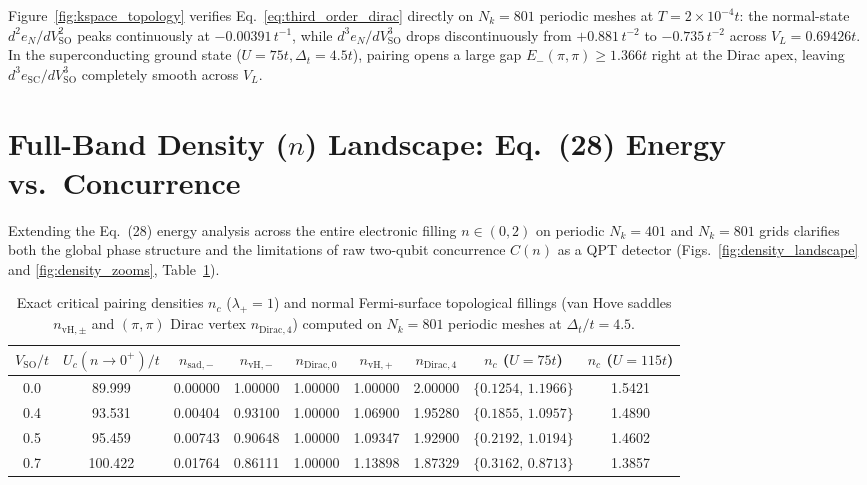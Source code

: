 \documentclass[aps,prb,twocolumn,superscriptaddress,longbibliography,floatfix]{revtex4-2}
\newcommand{\SO}{V_{\mathrm{SO}}}
\begin{document}
Figure~\ref{fig:kspace_topology} verifies Eq.~\eqref{eq:third_order_dirac} directly on $N_k=801$ periodic meshes at $T=2\times 10^{-4}t$: the normal-state $d^2e_N/d\SO^2$ peaks continuously at $-0.00391\,t^{-1}$, while $d^3e_N/d\SO^3$ drops discontinuously from $+0.881\,t^{-2}$ to $-0.735\,t^{-2}$ across $V_L = 0.69426t$. In the superconducting ground state ($U=75t,\Delta_t=4.5t$), pairing opens a large gap $E_-(\pi,\pi)\ge 1.366t$ right at the Dirac apex, leaving $d^3e_{\mathrm{SC}}/d\SO^3$ completely smooth across $V_L$.

\section{Full-Band Density (\texorpdfstring{$n$}{n}) Landscape: Eq.~(28) Energy vs.\ Concurrence}
\label{sec:density_landscape}

Extending the Eq.~(28) energy analysis across the entire electronic filling $n\in(0,2)$ on periodic $N_k=401$ and $N_k=801$ grids clarifies both the global phase structure and the limitations of raw two-qubit concurrence $C(n)$ as a QPT detector (Figs.~\ref{fig:density_landscape} and \ref{fig:density_zooms}, Table~\ref{tab:density_critical}).

\begin{table}[t]
\centering
\caption{Exact critical pairing densities $n_c$ ($\lambda_+=1$) and normal Fermi-surface topological fillings (van Hove saddles $n_{\mathrm{vH},\pm}$ and $(\pi,\pi)$ Dirac vertex $n_{\mathrm{Dirac},4}$) computed on $N_k=801$ periodic meshes at $\Delta_t/t=4.5$.}
\label{tab:density_critical}
\begin{tabular}{ccccccccc}
\toprule
$\SO/t$ & $U_c(n\to 0^+)/t$ & $n_{\mathrm{sad},-}$ & $n_{\mathrm{vH},-}$ & $n_{\mathrm{Dirac},0}$ & $n_{\mathrm{vH},+}$ & $n_{\mathrm{Dirac},4}$ & $n_c$ ($U=75t$) & $n_c$ ($U=115t$) \\
\midrule
0.0 & 89.999 & 0.00000 & 1.00000 & 1.00000 & 1.00000 & 2.00000 & $\{0.1254,\, 1.1966\}$ & 1.5421 \\
0.4 & 93.531 & 0.00404 & 0.93100 & 1.00000 & 1.06900 & 1.95280 & $\{0.1855,\, 1.0957\}$ & 1.4890 \\
0.5 & 95.459 & 0.00743 & 0.90648 & 1.00000 & 1.09347 & 1.92900 & $\{0.2192,\, 1.0194\}$ & 1.4602 \\
0.7 & 100.422 & 0.01764 & 0.86111 & 1.00000 & 1.13898 & 1.87329 & $\{0.3162,\, 0.8713\}$ & 1.3857 \\
\bottomrule
\end{tabular}
\end{table}
\end{document}
